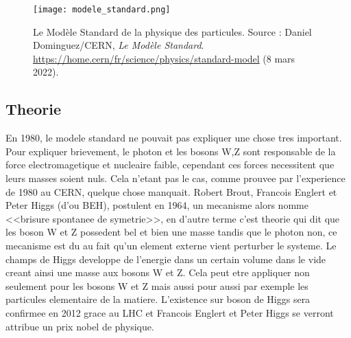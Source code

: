 \documentclass[a4paper,12pt,oneside,openright]{book} %
\begin{document}
\begin{figure}[htbp]
\centering
\texttt{[image: modele\_standard.png]} %
\caption[Le Modèle Standard]{Le Modèle Standard de la physique des particules. Source : Daniel Dominguez/CERN, {\itshape Le Modèle Standard}. \url{https://home.cern/fr/science/physics/standard-model} (8 mars 2022).}
\label{fig:ms}
\end{figure}

        \subsection{Theorie}
            En 1980, le modele standard ne pouvait pas expliquer une chose tres important. Pour expliquer brievement, le photon et les bosons W,Z sont responsable de la force electromagetique et nucleaire faible, cependant ces forces necessitent que leurs masses soient nuls. Cela n'etant pas le cas, comme prouvee par l'experience de 1980 au CERN, quelque chose manquait. Robert Brout, Francois Englert et Peter Higgs (d'ou BEH), postulent en 1964, un mecanisme alors nomme <<brisure spontanee de symetrie>>, en d'autre terme c'est theorie qui dit que les boson W et Z possedent bel et bien une masse tandis que le photon non, ce mecanisme est du au fait qu'un element externe vient perturber le systeme. Le champs de Higgs developpe de l'energie dans un certain volume dans le vide creant ainsi une masse aux bosons W et Z. Cela peut etre appliquer non seulement pour les bosons W et Z mais aussi pour aussi par exemple les particules elementaire de la matiere. L'existence sur boson de Higgs sera confirmee en 2012 grace au LHC et Francois Englert et Peter Higgs se verront attribue un prix nobel de physique. 

\end{document}
